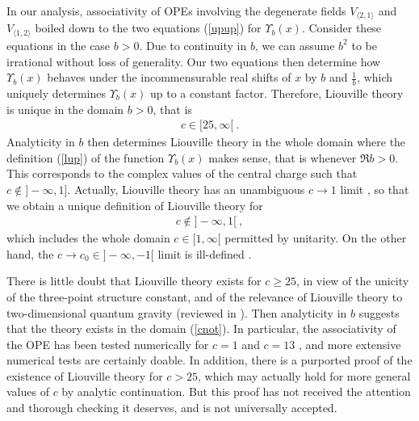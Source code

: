 \documentclass[12pt,a4paper,notitlepage]{report}
\numberwithin{equation}{section}
\theoremstyle{break}
\begin{document}
In our analysis, associativity of OPEs involving the degenerate fields $V_{\langle 2,1\rangle}$ and $V_{\langle 1,2\rangle}$ boiled down to the two equations 
(\ref{upup}) for $\Upsilon_b(x)$. Consider these equations 
in the case $b>0$. Due to continuity in $b$, we can assume $b^2$ to be irrational without loss of generality. Our two equations then determine how $\Upsilon_b(x)$ behaves under the incommensurable real shifts of $x$ by $b$ and $\frac{1}{b}$, which uniquely determines $\Upsilon_b(x)$ up to a constant factor.
Therefore, Liouville theory is unique in the domain $b>0$, that is 
\begin{align}
 c \in [25,\infty[ \ .
\end{align}
Analyticity in $b$ then determines Liouville theory in the whole domain where the definition (\ref{lup}) of the function $\Upsilon_b(x)$ makes sense, that is whenever $\Re b>0$. This corresponds to the complex values of the central charge such that $c\notin ]-\infty,1]$.
Actually, Liouville theory has an unambiguous $c\rightarrow 1$ limit \cite{sch03}, so that we obtain a unique definition of Liouville theory for
\begin{align}
 c\notin ]-\infty,1[ \ ,
\label{cnot}
\end{align}
which includes the whole domain $c\in [1,\infty[$ permitted by unitarity.
On the other hand, the $c\rightarrow c_0\in ]-\infty,-1[$ limit is ill-defined \cite{zam05}. 

There is little doubt that Liouville theory exists for $c\geq 25$, in view of the unicity of the three-point structure constant, and of the relevance of Liouville theory to two-dimensional quantum gravity (reviewed in \cite{zam05}). Then analyticity in $b$ suggests that the theory exists in the domain (\ref{cnot}). In particular, the associativity of the OPE has been tested numerically for $c=1$ \cite{rw01} and $c=13$ \cite{zz95}, and more extensive numerical tests are certainly doable. In addition, there is a purported proof \cite{tes03b} of the existence of Liouville theory for $c>25$, which may actually hold for more general values of $c$ by analytic continuation. But this proof has not received the attention and thorough checking it deserves, and is not universally accepted.
\end{document}

